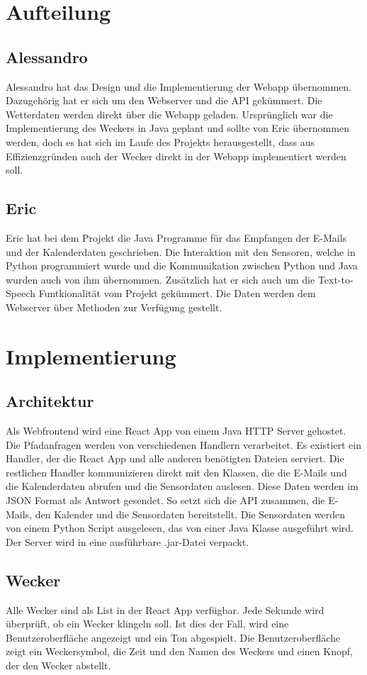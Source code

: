 \documentclass[11pt,a4paper]{article}
\begin{document}
\section{Aufteilung}
\subsection{Alessandro}
Alessandro hat das Design und die Implementierung der Webapp übernommen. Dazugehörig hat er sich um den Webserver und die API gekümmert. Die Wetterdaten werden direkt über die Webapp geladen. Ursprünglich war die Implementierung des Weckers in Java geplant und sollte von Eric übernommen werden, doch es hat sich im Laufe des Projekts herausgestellt, dass aus Effizienzgründen auch der Wecker direkt in der Webapp implementiert werden soll.

\subsection{Eric}
Eric hat bei dem Projekt die Java Programme für das Empfangen der E-Mails und der Kalenderdaten geschrieben. Die Interaktion mit den Sensoren, welche in Python programmiert wurde und die Kommunikation zwischen Python und Java wurden auch von ihm \"ubernommen. Zusätzlich hat er sich auch um die Text-to-Speech Funtkionalit\"at vom Projekt gek\"ummert. Die Daten werden dem Webserver über Methoden zur Verfügung gestellt.

\section{Implementierung}
\subsection{Architektur}
Als Webfrontend wird eine React App von einem Java HTTP Server gehostet. Die Pfadanfragen werden von verschiedenen Handlern verarbeitet. Es existiert ein Handler, der die React App und alle anderen benötigten Dateien serviert. Die restlichen Handler kommunizieren direkt mit den Klassen, die die E-Mails und die Kalenderdaten abrufen und die Sensordaten auslesen. Diese Daten werden im JSON Format als Antwort gesendet. So setzt sich die API zusammen, die E-Mails, den Kalender und die Sensordaten bereitstellt. Die Sensordaten werden von einem Python Script ausgelesen, das von einer Java Klasse ausgeführt wird. Der Server wird in eine ausführbare .jar-Datei verpackt.

\subsection{Wecker}
Alle Wecker sind als List in der React App verfügbar. Jede Sekunde wird überprüft, ob ein Wecker klingeln soll. Ist dies der Fall, wird eine Benutzeroberfläche angezeigt und ein Ton abgespielt. Die Benutzeroberfläche zeigt ein Weckersymbol, die Zeit und den Namen des Weckers und einen Knopf, der den Wecker abstellt.
\end{document}

